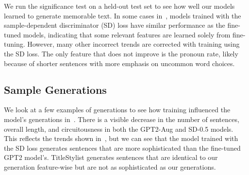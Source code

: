 We run the significance test on a held-out test set to see how well our models learned to generate memorable text. In some cases in~, models trained with the sample-dependent discriminator (SD) loss have similar performance as the fine-tuned models, indicating that some relevant features are learned solely from fine-tuning. However, many other incorrect trends are corrected with training using the SD loss. The only feature that does not improve is the pronoun rate, likely because of shorter sentences with more emphasis on uncommon word choices. 

\subsection{Sample Generations}
\label{subsec:si_mem_sample}

We look at a few examples of generations to see how training influenced the model's generations in~. There is a visible decrease in the number of sentences, overall length, and circuitousness in both the GPT2-Aug and SD-0.5 models. This reflects the trends shown in~, but we can see that the model trained with the SD loss generates sentences that are more sophisticated than the fine-tuned GPT2 model's. TitleStylist generates sentences that are identical to our generation feature-wise but are not as sophisticated as our generations.

